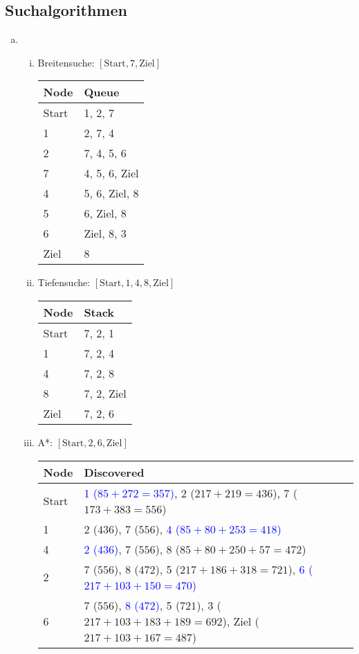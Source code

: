 \documentclass[fleqn]{scrartcl}
\begin{document}
\subsection{Suchalgorithmen}
\begin{enumerate}[a)]
\item
\begin{enumerate}[i.]
\item Breitensuche: $[\text{Start},7,\text{Ziel}]$\\
\begin{tabularx}{\linewidth}{|l|X|}
\hline
Node&Queue\\
\hline\hline
Start&1, 2, 7\\\hline
1&2, 7, 4\\\hline
2&7, 4, 5, 6\\\hline
7&4, 5, 6, Ziel\\\hline
4&5, 6, Ziel, 8\\\hline
5&6, Ziel, 8\\\hline
6&Ziel, 8, 3\\\hline
Ziel&8\\\hline
\end{tabularx}
\item Tiefensuche: $[\text{Start},1,4,8,\text{Ziel}]$\\
\begin{tabularx}{\linewidth}{|l|X|}
\hline
Node&Stack\\
\hline\hline
Start&7, 2, 1\\\hline
1&7, 2, 4\\\hline
4&7, 2, 8\\\hline
8&7, 2, Ziel\\\hline
Ziel&7, 2, 6\\\hline
\end{tabularx}
\item A*: $[\text{Start},2,6,\text{Ziel}]$\\
\begin{tabularx}{\linewidth}{|l|X|}
\hline
Node&Discovered\\
\hline\hline
Start&\textcolor{blue}{1 ($85+272=357$)}, 2 ($217+219=436$), 7 ($173+383=556$)\\\hline
1&2 ($436$), 7 ($556$), \textcolor{blue}{4 ($85+80+253=418$)}\\\hline
4&\textcolor{blue}{2 ($436$)}, 7 ($556$), 8 ($85+80+250+57=472$)\\\hline
2&7 ($556$), 8 ($472$), 5 ($217+186+318=721$), \textcolor{blue}{6 ($217+103+150=470$)}\\\hline
6&7 ($556$), \textcolor{blue}{8 ($472$)}, 5 ($721$), 3 ($217+103+183+189=692$), Ziel ($217+103+167=487$)\\\hline

\end{tabularx}
\end{enumerate}
\end{enumerate}
\end{document}
